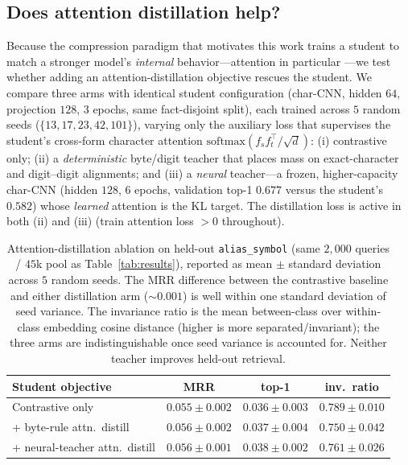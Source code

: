 \documentclass[11pt]{article}
\begin{document}
\subsection{Does attention distillation help?}
\label{sec:ablation}
Because the compression paradigm that motivates this work trains a student to
match a stronger model's \emph{internal} behavior---attention in particular
\citep{zagoruyko2017attention}---we test whether adding an attention-distillation
objective rescues the student. We compare three arms with identical student
configuration (char-CNN, hidden $64$, projection $128$, $3$ epochs,
same fact-disjoint split), each trained across $5$ random seeds
($\{13,17,23,42,101\}$), varying only the auxiliary loss that supervises the
student's cross-form character attention $\mathrm{softmax}(f_s f_t^{\top}/\sqrt{d})$:
(i) contrastive only; (ii) a \emph{deterministic} byte/digit teacher that places
mass on exact-character and digit--digit alignments; and (iii) a \emph{neural}
teacher---a frozen, higher-capacity char-CNN (hidden $128$, $6$ epochs, validation
top-1 $0.677$ versus the student's $0.582$) whose \emph{learned} attention is the
KL target. The distillation loss is active in both (ii) and (iii)
(train attention loss $>0$ throughout).

\begin{table}[t]
\centering
\small
\setlength{\tabcolsep}{4pt}
\begin{tabular}{lccc}
\toprule
\textbf{Student objective} & \textbf{MRR} & \textbf{top-1} & \textbf{inv.\ ratio} \\
\midrule
Contrastive only                 & $0.055 \pm 0.002$ & $0.036 \pm 0.003$ & $0.789 \pm 0.010$ \\
\;\; + byte-rule attn.\ distill   & $0.056 \pm 0.002$ & $0.037 \pm 0.004$ & $0.750 \pm 0.042$ \\
\;\; + neural-teacher attn.\ distill & $0.056 \pm 0.001$ & $0.038 \pm 0.002$ & $0.761 \pm 0.026$ \\
\bottomrule
\end{tabular}
\caption{Attention-distillation ablation on held-out \texttt{alias\_symbol}
(same $2{,}000$ queries / $45$k pool as Table~\ref{tab:results}), reported as
mean $\pm$ standard deviation across $5$ random seeds. The MRR difference between
the contrastive baseline and either distillation arm ($\sim\!0.001$) is well
within one standard deviation of seed variance. The invariance ratio is the
mean between-class over within-class embedding cosine distance (higher is more
separated/invariant); the three arms are indistinguishable once seed variance is
accounted for. Neither teacher improves held-out retrieval.}
\label{tab:ablation}
\end{table}
\end{document}
